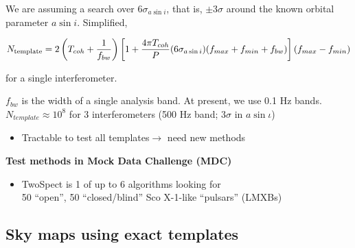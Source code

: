 \noindent We are assuming a search over $6\sigma_{a \sin i}$, that is, $\pm 3 \sigma$ around the known orbital parameter $a\sin i$. Simplified,

\begin{equation}
N_{\textup{template}} = 2 \left(T_{coh} + \frac{1}{f_{bw}}\right)\left[ 1+\frac{4 \pi T_{coh}}{P} (6\sigma_{a \sin i})(f_{max} + f_{min} + f_{bw})\right] (f_{max} - f_{min})
\label{N_template_simple}
\end{equation}

\noindent for a single interferometer. 

$f_{bw}$ is the width of a single analysis band. At present, we use 0.1 Hz bands.
$N_{template}\approx10^{8}$ for 3 interferometers (500 Hz band; $3\sigma$
in $a\sin\iota$)$ $
\begin{itemize}
\item Tractable to test all templates$\rightarrow$ need new methods
\end{itemize}

\textbf{Test methods in Mock Data Challenge (MDC)}
\begin{itemize}
\item TwoSpect is 1 of up to 6 algorithms looking for \\
50 ``open'', 50 ``closed/blind'' Sco X-1-like ``pulsars'' (LMXBs)
\end{itemize}

\subsection{Sky maps using exact templates}


